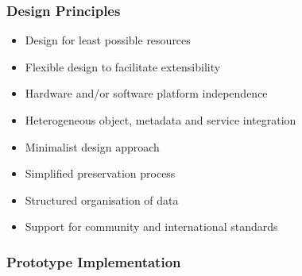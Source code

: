 \documentclass[xcolor=dvitex,t,11pt]{beamer}
\begin{document}

\begin{frame}[fragile]
\frametitle{Design Principles}
\begin{itemize}
\item Design for least possible resources
\item Flexible design to facilitate extensibility
\item Hardware and/or software platform independence
\item Heterogeneous object, metadata and service integration
\item Minimalist design approach
\item Simplified preservation process
\item Structured organisation of data
\item Support for community and international standards
\end{itemize}

\end{frame}


\begin{frame}[fragile]
\frametitle{Prototype Implementation}
\begin{figure}
\centering

\end{figure}
\end{frame}
\end{document}
